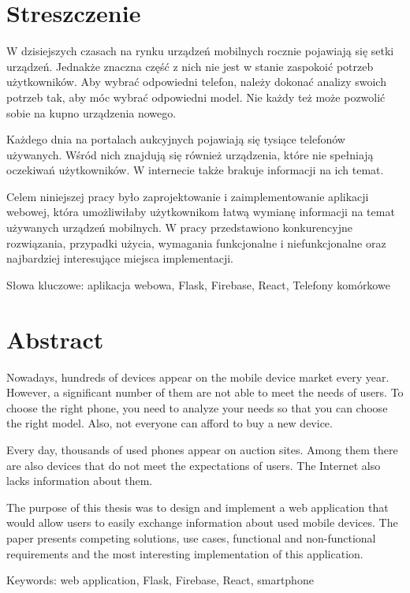 \section*{Streszczenie}
W dzisiejszych czasach na rynku urządzeń mobilnych rocznie pojawiają się setki urządzeń. Jednakże znaczna część z nich nie jest w stanie zaspokoić potrzeb użytkowników. Aby wybrać odpowiedni telefon, należy dokonać analizy swoich potrzeb tak, aby móc wybrać odpowiedni model. Nie każdy też może pozwolić sobie na kupno urządzenia nowego.

Każdego dnia na portalach aukcyjnych pojawiają się tysiące telefonów używanych. Wśród nich znajdują się również urządzenia, które nie spełniają oczekiwań użytkowników. W internecie także brakuje informacji na ich temat.

Celem niniejszej pracy było zaprojektowanie i zaimplementowanie aplikacji webowej, która umożliwiłaby użytkownikom łatwą wymianę informacji na temat używanych urządzeń mobilnych. W pracy przedstawiono konkurencyjne rozwiązania, przypadki użycia, wymagania funkcjonalne i niefunkcjonalne oraz najbardziej interesujące miejsca implementacji.

Słowa kluczowe: aplikacja webowa, Flask, Firebase, React, Telefony komórkowe

\section*{Abstract}
Nowadays, hundreds of devices appear on the mobile device market every year. However, a significant number of them are not able to meet the needs of users. To choose the right phone, you need to analyze your needs so that you can choose the right model. Also, not everyone can afford to buy a new device.

Every day, thousands of used phones appear on auction sites. Among them there are also devices that do not meet the expectations of users. The Internet also lacks information about them.  

The purpose of this thesis was to design and implement a web application that would allow users to easily exchange information about used mobile devices. The paper presents competing solutions, use cases, functional and non-functional requirements and the most interesting implementation of this application.

Keywords: web application, Flask, Firebase, React, smartphone
